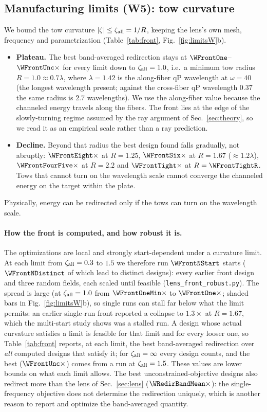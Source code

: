 \subsection{Manufacturing limits (W5): tow curvature}\label{sec:front}
We bound the tow curvature $|\zeta|\le\zeta_{\rm all}=1/R$, keeping the lens's own mesh,
frequency and parametrization (Table~\ref{tab:front}, Fig.~\ref{fig:limitsW}b).
\begin{itemize}[itemsep=1pt]
\item \textbf{Plateau.} The best band-averaged redirection stays at
  $\WFrontOne$--$\WFrontUnc\times$ for every limit down to $\zeta_{\rm all}=1.0$, i.e.\ a
  minimum tow radius $R=1.0\approx0.7\lambda$, where $\lambda=1.42$ is the along-fiber qP
  wavelength at $\omega=40$ (the longest wavelength present; against the cross-fiber qP
  wavelength $0.37$ the same radius is $2.7$ wavelengths). We use the along-fiber value
  because the channeled energy travels along the fibers. The front lies at the edge of the
  slowly-turning regime assumed by the ray argument of Sec.~\ref{sec:theory}, so we read
  it as an empirical scale rather than a ray prediction.
\item \textbf{Decline.} Beyond that radius the best design found falls gradually, not
  abruptly:
  $\WFrontEight\times$ at $R=1.25$, $\WFrontSix\times$ at $R=1.67$ ($\approx1.2\lambda$),
  $\WFrontFourFive\times$ at $R=2.2$ and $\WFrontTight\times$ at $R=\WFrontTightR$. Tows that
  cannot turn on the wavelength scale cannot converge the channeled energy on the target
  within the plate.
\end{itemize}
Physically, energy can be redirected only if the tows can turn on the wavelength scale.
\paragraph{How the front is computed, and how robust it is.} The optimizations are local
and strongly start-dependent under a curvature limit. At each limit from
$\zeta_{\rm all}=0.3$ to $1.5$ we therefore run $\WFrontNStart$ starts ($\WFrontNDistinct$ of which lead to distinct designs): every
earlier front design and three random fields, each scaled until feasible
(\texttt{lens\_\allowbreak front\_\allowbreak robust.py}). The spread is large (at
$\zeta_{\rm all}=1.0$ from $\WFrontOneMin\times$ to $\WFrontOne\times$; shaded bars in
Fig.~\ref{fig:limitsW}b), so single runs can stall far below what the limit permits: an
earlier single-run front reported a collapse to $1.3\times$ at $R=1.67$, which the
multi-start study shows was a stalled run. A design whose actual curvature satisfies a
limit is feasible for that limit and for every looser one, so Table~\ref{tab:front}
reports, at each limit, the best band-averaged redirection over \emph{all} computed
designs that satisfy it; for $\zeta_{\rm all}=\infty$ every design counts, and the best
($\WFrontUnc\times$) comes from a run at $\zeta_{\rm all}=1.5$. These values are lower
bounds on what each limit allows. The best unconstrained-objective designs also redirect
more than the lens of Sec.~\ref{sec:lens} ($\WRedirBandMean\times$): the single-frequency
objective does not determine the redirection uniquely, which is another reason to report
and optimize the band-averaged quantity.

